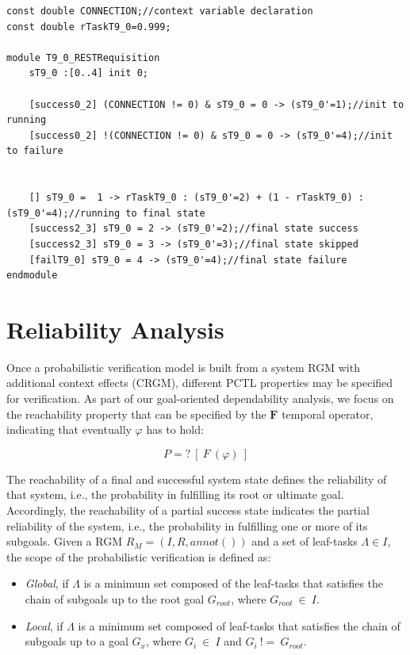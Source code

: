 \begin{lstlisting}[language=Prism, caption={Variable declaration and module representing a leaf-task restricted by a context.},label={lst:PRISM_CTX_TASK}] 
const double CONNECTION;//context variable declaration
const double rTaskT9_0=0.999;

module T9_0_RESTRequisition
	sT9_0 :[0..4] init 0;
	
	[success0_2] (CONNECTION != 0) & sT9_0 = 0 -> (sT9_0'=1);//init to running
	[success0_2] !(CONNECTION != 0) & sT9_0 = 0 -> (sT9_0'=4);//init to failure


	[] sT9_0 =  1 -> rTaskT9_0 : (sT9_0'=2) + (1 - rTaskT9_0) : (sT9_0'=4);//running to final state
	[success2_3] sT9_0 = 2 -> (sT9_0'=2);//final state success
	[success2_3] sT9_0 = 3 -> (sT9_0'=3);//final state skipped
	[failT9_0] sT9_0 = 4 -> (sT9_0'=4);//final state failure
endmodule
\end{lstlisting}

\section{Reliability Analysis}

Once a probabilistic verification model is built from a system RGM with additional context effects (CRGM), different PCTL properties may be specified for verification. As part of our goal-oriented dependability analysis, we focus on the reachability property that can be specified by the $\textbf{F}$ temporal operator, indicating that eventually $\varphi$ has to hold:

\begin{equation}\label{eq:PROB_EXISTANCE}
P=?\ [\ F\ (\varphi)\ ]
\end{equation}

The reachability of a final and successful system state defines the reliability of that system, i.e., the probability in fulfilling its root or ultimate goal. Accordingly, the reachability of a partial success state indicates the partial reliability of the system, i.e., the probability in fulfilling one or more of its subgoals. Given a RGM $R_M = (I, R, annot())$ and a set of leaf-tasks $\Lambda \in I$, the scope of the probabilistic verification is defined as:

\begin{itemize}

\item \textit{Global}, if $\Lambda$ is a minimum set composed of the leaf-tasks that satisfies the chain of subgoals up to the root goal $G_{root}$, where $G_{root}\ \in\ I$. 
\medskip

\item \textit{Local}, if $\Lambda$ is a minimum set composed of leaf-tasks that satisfies the chain of subgoals up to a goal $G_x$, where $G_i\ \in\ I$ and $G_i\ !=\ G_{root}$. 
\medskip

\end{itemize}



